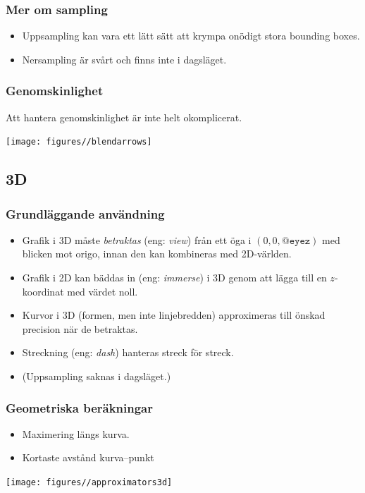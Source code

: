 \documentclass[noamsthm,handout]{beamer}
\newcommand{\inEnglish}[1]{(eng: \emph{#1})}
\begin{document}
\begin{frame}\frametitle{Mer om sampling}
  \begin{itemize}
  \item Uppsampling kan vara ett lätt sätt att krympa onödigt stora bounding boxes.
  \item Nersampling är svårt och finns inte i dagsläget.
  \end{itemize}
\end{frame}
\begin{frame}\frametitle{Genomskinlighet}
  Att hantera genomskinlighet är inte helt okomplicerat.
  \begin{center}
    \texttt{[image: figures//blendarrows]}
  \end{center}
\end{frame}
\subsection{3D}
\begin{frame}\frametitle{Grundläggande användning}
  \begin{itemize}
  \item Grafik i 3D måste \emph{betraktas} \inEnglish{view} från ett öga i $(0,0,\texttt{@eyez})$ med blicken mot origo, innan den kan kombineras med 2D-världen.
  \item Grafik i 2D kan bäddas in \inEnglish{immerse} i 3D genom att lägga till en $z$-koordinat med värdet noll.
  \item Kurvor i 3D (formen, men inte linjebredden) approximeras till önskad precision när de betraktas.
  \item Streckning \inEnglish{dash} hanteras streck för streck.
  \item (Uppsampling saknas i dagsläget.)
  \end{itemize}
\end{frame}
\begin{frame}\frametitle{Geometriska beräkningar}
  \begin{itemize}
  \item Maximering längs kurva.
  \item Kortaste avstånd kurva--punkt
  \end{itemize}
  \begin{center}
    \texttt{[image: figures//approximators3d]}
  \end{center}
\end{frame}
\end{document}
